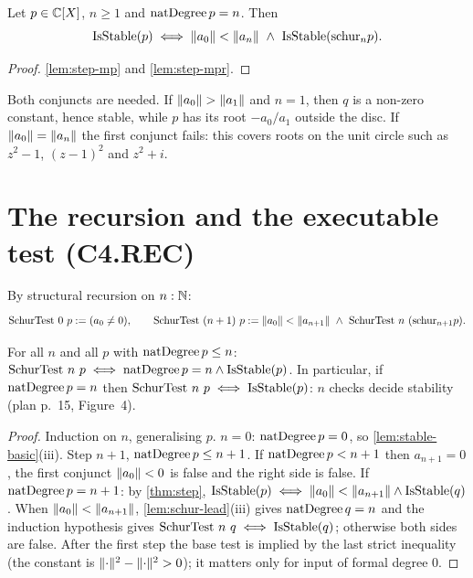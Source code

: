 \begin{theorem}\label{thm:step}
Let $p\in\mathbb{C}[X]$, $n\ge1$ and $\mathrm{natDegree}\,p=n$. Then
\[ \stable(p)\iff\nm{a_0}<\nm{a_n}\ \wedge\ \stable(\Sch_n p). \]
\end{theorem}
\begin{proof}
\ref{lem:step-mp} and \ref{lem:step-mpr}.
\end{proof}

\begin{remark}
Both conjuncts are needed. If $\lVert a_0 \rVert>\lVert a_1 \rVert$ and $n=1$, then $q$ is a
non-zero constant, hence stable, while $p$ has its root $-a_0/a_1$ outside the
disc. If $\lVert a_0 \rVert=\lVert a_n \rVert$ the first conjunct fails: this covers roots on the
unit circle such as $z^2-1$, $(z-1)^2$ and $z^2+i$.
\end{remark}

\chapter{The recursion and the executable test (C4.REC)}

\begin{definition}\label{def:SchurTest}
By structural recursion on $n:\mathbb{N}$:
\[ \mathrm{SchurTest}\ 0\ p := (a_0\ne0),\qquad
\mathrm{SchurTest}\ (n+1)\ p := \nm{a_0}<\nm{a_{n+1}}\ \wedge\ \mathrm{SchurTest}\ n\ (\Sch_{n+1}p). \]
\end{definition}

\begin{theorem}\label{thm:SchurTest}
For all $n$ and all $p$ with $\mathrm{natDegree}\,p\le n$:
$\mathrm{SchurTest}\ n\ p\iff\natdeg\,p=n\wedge\stable(p)$.
In particular, if $\mathrm{natDegree}\,p=n$ then $\mathrm{SchurTest}\ n\ p\iff\mathrm{IsStable}(p)$:
$n$ checks decide stability (plan p.~15, Figure~4).
\end{theorem}
\begin{proof}
Induction on $n$, generalising $p$. $n=0$: $\mathrm{natDegree}\,p=0$, so
\ref{lem:stable-basic}(iii). Step $n+1$, $\mathrm{natDegree}\,p\le n+1$. If
$\mathrm{natDegree}\,p<n+1$ then $a_{n+1}=0$, the first conjunct $\lVert a_0 \rVert<0$ is false and
the right side is false. If $\mathrm{natDegree}\,p=n+1$: by \ref{thm:step},
$\mathrm{IsStable}(p)\iff\lVert a_0 \rVert<\lVert a_{n+1} \rVert\wedge\mathrm{IsStable}(q)$. When
$\lVert a_0 \rVert<\lVert a_{n+1} \rVert$, \ref{lem:schur-lead}(iii) gives $\mathrm{natDegree}\,q=n$ and the
induction hypothesis gives $\mathrm{SchurTest}\ n\ q\iff\stable(q)$; otherwise
both sides are false. After the first step the base test is implied by the last
strict inequality (the constant is $\lVert \cdot \rVert^2-\lVert \cdot \rVert^2>0$); it matters
only for input of formal degree $0$.
\end{proof}

